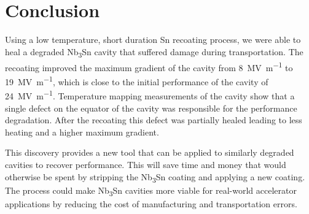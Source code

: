 \documentclass{revtex4-2}
\begin{document}
\section{Conclusion}
\label{sec:Conclusion}

Using a low temperature, short duration Sn recoating process, we were able to heal a degraded Nb\textsubscript{3}Sn cavity that suffered damage during transportation. The recoating improved the maximum gradient of the cavity from \qty{8}{\mega\volt\per\meter} to \qty{19}{\mega\volt\per\meter}, which is close to the initial performance of the cavity of \qty{24}{\mega\volt\per\meter}. Temperature mapping measurements of the cavity show that a single defect on the equator of the cavity was responsible for the performance degradation. After the recoating this defect was partially healed leading to less heating and a higher maximum gradient.

This discovery provides a new tool that can be applied to similarly degraded cavities to recover performance. This will save time and money that would otherwise be spent by stripping the Nb\textsubscript{3}Sn coating and applying a new coating. The process could make Nb\textsubscript{3}Sn cavities more viable for real-world accelerator applications by reducing the cost of manufacturing and transportation errors.





\end{document}
